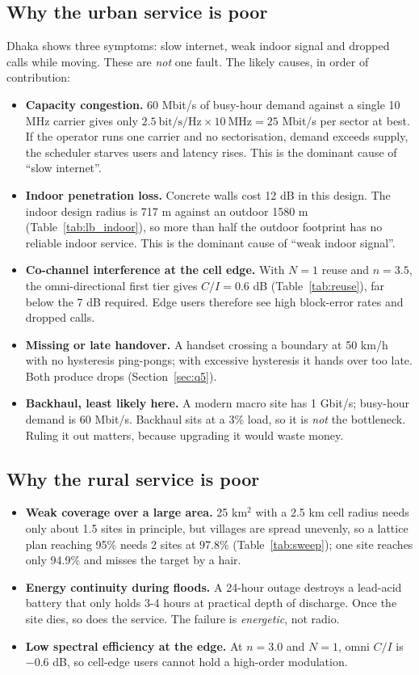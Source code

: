 \documentclass[9pt,a4paper]{article}
\begin{document}
\subsection{Why the urban service is poor}
Dhaka shows three symptoms: slow internet, weak indoor signal and dropped calls while moving.
These are \emph{not} one fault. The likely causes, in order of contribution:

\begin{itemize}[leftmargin=1.4em,itemsep=1pt,topsep=2pt]
\item \textbf{Capacity congestion.} 60 Mbit/s of busy-hour demand against a single 10 MHz carrier
gives only $2.5\ \text{bit/s/Hz}\times10\ \text{MHz}=25$ Mbit/s per sector at best. If the
operator runs one carrier and no sectorisation, demand exceeds supply, the scheduler starves
users and latency rises. This is the dominant cause of ``slow internet''.
\item \textbf{Indoor penetration loss.} Concrete walls cost 12 dB in this design. The indoor
design radius is 717 m against an outdoor 1580 m (Table~\ref{tab:lb_indoor}), so more than half
the outdoor footprint has no reliable indoor service. This is the dominant cause of ``weak
indoor signal''.
\item \textbf{Co-channel interference at the cell edge.} With $N=1$ reuse and $n=3.5$, the
omni-directional first tier gives $C/I=0.6$ dB (Table~\ref{tab:reuse}), far below the 7 dB
required. Edge users therefore see high block-error rates and dropped calls.
\item \textbf{Missing or late handover.} A handset crossing a boundary at 50 km/h with no
hysteresis ping-pongs; with excessive hysteresis it hands over too late. Both produce drops
(Section~\ref{sec:q5}).
\item \textbf{Backhaul, least likely here.} A modern macro site has 1 Gbit/s; busy-hour demand is
60 Mbit/s. Backhaul sits at a 3\% load, so it is \emph{not} the bottleneck. Ruling it out matters,
because upgrading it would waste money.
\end{itemize}

\subsection{Why the rural service is poor}
\begin{itemize}[leftmargin=1.4em,itemsep=1pt,topsep=2pt]
\item \textbf{Weak coverage over a large area.} 25 km$^2$ with a 2.5 km cell radius needs only
about 1.5 sites in principle, but villages are spread unevenly, so a lattice plan reaching 95\%
needs 2 sites at 97.8\% (Table~\ref{tab:sweep}); one site reaches only 94.9\% and misses the
target by a hair.
\item \textbf{Energy continuity during floods.} A 24-hour outage destroys a lead-acid battery
that only holds 3-4 hours at practical depth of discharge. Once the site dies, so does the
service. The failure is \emph{energetic}, not radio.
\item \textbf{Low spectral efficiency at the edge.} At $n=3.0$ and $N=1$, omni $C/I$ is
$-0.6$ dB, so cell-edge users cannot hold a high-order modulation.
\end{itemize}
\end{document}
